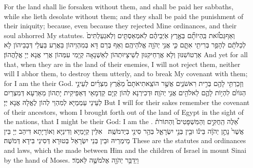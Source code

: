{For the land shall lie forsaken without them, and shall be paid her sabbaths, while she lieth desolate without them; and they shall be paid the punishment of their iniquity; because, even because they rejected Mine ordinances, and their soul abhorred My statutes.}{}
{וְאַף\maqqaf גַּם\maqqaf זֹ֠את בִּֽהְיוֹתָ֞ם בְּאֶ֣רֶץ אֹֽיְבֵיהֶ֗ם לֹֽא\maqqaf מְאַסְתִּ֤ים וְלֹֽא\maqqaf גְעַלְתִּים֙ לְכַלֹּתָ֔ם לְהָפֵ֥ר בְּרִיתִ֖י אִתָּ֑ם כִּ֛י אֲנִ֥י יְהֹוָ֖ה אֱלֹהֵיהֶֽם׃}
{וְאַף בְּרַם דָּא בְּמִהְוֵיהוֹן בַּאֲרַע בַּעֲלֵי דְּבָבֵיהוֹן לָא אַרְטוֹשִׁנּוּן וְלָא אֲרַחֵיקִנּוּן לְשֵׁיצָיוּתְהוֹן לְאַשְׁנָאָה קְיָמִי עִמְּהוֹן אֲרֵי אֲנָא יְיָ אֱלָהֲהוֹן׃}
{And yet for all that, when they are in the land of their enemies, I will not reject them, neither will I abhor them, to destroy them utterly, and to break My covenant with them; for I am the \lord\space their God.}{}
{וְזָכַרְתִּ֥י לָהֶ֖ם בְּרִ֣ית רִאשֹׁנִ֑ים אֲשֶׁ֣ר הוֹצֵֽאתִי\maqqaf אֹתָם֩ מֵאֶ֨רֶץ מִצְרַ֜יִם לְעֵינֵ֣י הַגּוֹיִ֗ם לִהְי֥וֹת לָהֶ֛ם לֵאלֹהִ֖ים אֲנִ֥י יְהֹוָֽה׃}
{וּדְכִירְנָא לְהוֹן קְיָם קַדְמָאֵי דְּאַפֵּיקִית יָתְהוֹן מֵאַרְעָא דְּמִצְרַיִם לְעֵינֵי עַמְמַיָּא לְמִהְוֵי לְהוֹן לֶאֱלָהּ אֲנָא יְיָ׃}
{But I will for their sakes remember the covenant of their ancestors, whom I brought forth out of the land of Egypt in the sight of the nations, that I might be their God: I am the \lord.}{}
{אֵ֠לֶּה הַֽחֻקִּ֣ים וְהַמִּשְׁפָּטִים֮ וְהַתּוֹרֹת֒ אֲשֶׁר֙ נָתַ֣ן יְהֹוָ֔ה בֵּינ֕וֹ וּבֵ֖ין בְּנֵ֣י יִשְׂרָאֵ֑ל בְּהַ֥ר סִינַ֖י בְּיַד\maqqaf מֹשֶֽׁה׃ \petucha }
{אִלֵּין קְיָמַיָּא וְדִינַיָּא וְאוֹרָיָתָא דִּיהַב יְיָ בֵּין מֵימְרֵיהּ וּבֵין בְּנֵי יִשְׂרָאֵל בְּטוּרָא דְּסִינַי בִּידָא דְּמֹשֶׁה׃}
{These are the statutes and ordinances and laws, which the \lord\space made between Him and the children of Israel in mount Sinai by the hand of Moses.}{}
\newperek
{}
{וַיְדַבֵּ֥ר יְהֹוָ֖ה אֶל\maqqaf מֹשֶׁ֥ה לֵּאמֹֽר׃}
